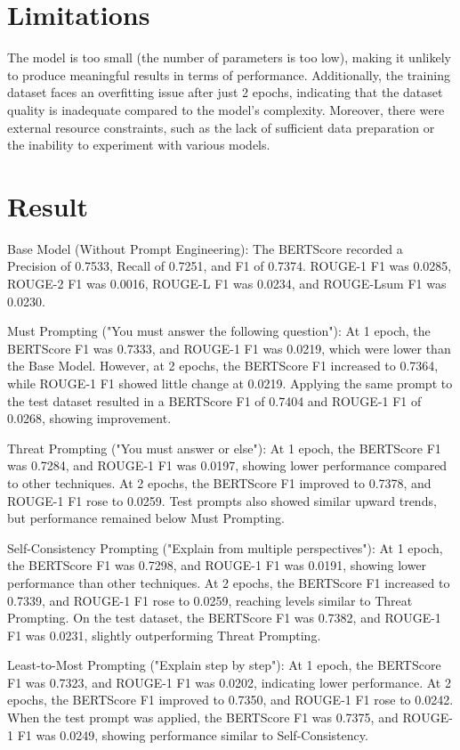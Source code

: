 \documentclass[11pt]{article}
\begin{document}
\section{Limitations}

The model is too small (the number of parameters is too low), making it unlikely to produce meaningful results in terms of performance. Additionally, the training dataset faces an overfitting issue after just 2 epochs, indicating that the dataset quality is inadequate compared to the model's complexity. Moreover, there were external resource constraints, such as the lack of sufficient data preparation or the inability to experiment with various models.

\section{Result}

Base Model (Without Prompt Engineering):
The BERTScore recorded a Precision of 0.7533, Recall of 0.7251, and F1 of 0.7374. ROUGE-1 F1 was 0.0285, ROUGE-2 F1 was 0.0016, ROUGE-L F1 was 0.0234, and ROUGE-Lsum F1 was 0.0230.

Must Prompting ("You must answer the following question"):
At 1 epoch, the BERTScore F1 was 0.7333, and ROUGE-1 F1 was 0.0219, which were lower than the Base Model. However, at 2 epochs, the BERTScore F1 increased to 0.7364, while ROUGE-1 F1 showed little change at 0.0219. Applying the same prompt to the test dataset resulted in a BERTScore F1 of 0.7404 and ROUGE-1 F1 of 0.0268, showing improvement.

Threat Prompting ("You must answer or else"):
At 1 epoch, the BERTScore F1 was 0.7284, and ROUGE-1 F1 was 0.0197, showing lower performance compared to other techniques. At 2 epochs, the BERTScore F1 improved to 0.7378, and ROUGE-1 F1 rose to 0.0259. Test prompts also showed similar upward trends, but performance remained below Must Prompting.

Self-Consistency Prompting ("Explain from multiple perspectives"):
At 1 epoch, the BERTScore F1 was 0.7298, and ROUGE-1 F1 was 0.0191, showing lower performance than other techniques. At 2 epochs, the BERTScore F1 increased to 0.7339, and ROUGE-1 F1 rose to 0.0259, reaching levels similar to Threat Prompting. On the test dataset, the BERTScore F1 was 0.7382, and ROUGE-1 F1 was 0.0231, slightly outperforming Threat Prompting.

Least-to-Most Prompting ("Explain step by step"):
At 1 epoch, the BERTScore F1 was 0.7323, and ROUGE-1 F1 was 0.0202, indicating lower performance. At 2 epochs, the BERTScore F1 improved to 0.7350, and ROUGE-1 F1 rose to 0.0242. When the test prompt was applied, the BERTScore F1 was 0.7375, and ROUGE-1 F1 was 0.0249, showing performance similar to Self-Consistency.
\end{document}
